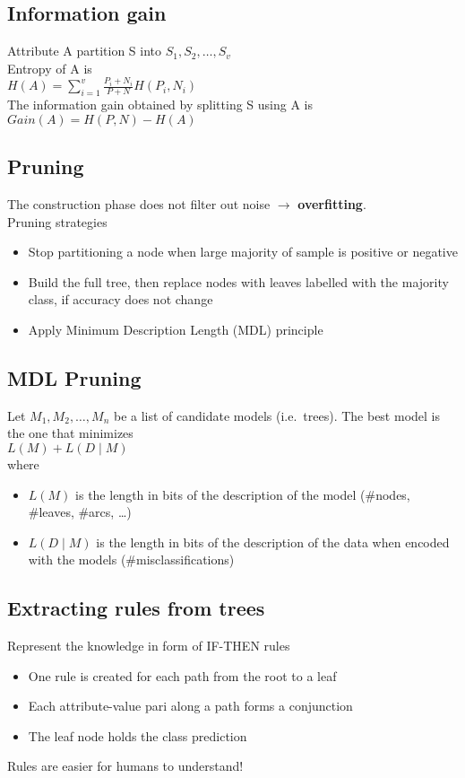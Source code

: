 \subsection{Information gain}
Attribute A partition S into $ S_1, S_2, \ldots, S_v $ \\
Entropy of A is \\
$ H(A) = \sum_{i = 1}^v \frac{P_i + N_i}{P + N} H(P_i, N_i) $ \\

The information gain obtained by splitting S using A is \\
$ Gain(A) = H(P, N) - H(A) $

\subsection{Pruning}
The construction phase does not filter out noise $ \rightarrow $
\textbf{overfitting}. \\
Pruning strategies
\begin{itemize}
\item Stop partitioning a node when large majority of sample is
  positive or negative
\item Build the full tree, then replace nodes with leaves labelled
  with the majority class, if accuracy does not change
\item Apply Minimum Description Length (MDL) principle
\end{itemize}

\subsection{MDL Pruning}
Let $ M_1, M_2, \ldots, M_n $ be a list of candidate models (i.e.\
trees). The best model is the one that minimizes \\
$ L(M) + L(D \mid M) $ \\
where
\begin{itemize}
\item $ L(M) $ is the length in bits of the description of the model
  (\#nodes, \#leaves, \#arcs, \ldots)
\item $ L(D \mid M) $ is the length in bits of the description of the
  data when encoded with the models (\#misclassifications)
\end{itemize}

\subsection{Extracting rules from trees}
Represent the knowledge in form of IF-THEN rules
\begin{itemize}
\item One rule is created for each path from the root to a leaf
\item Each attribute-value pari along a path forms a conjunction
\item The leaf node holds the class prediction
\end{itemize}
Rules are easier for humans to understand!

